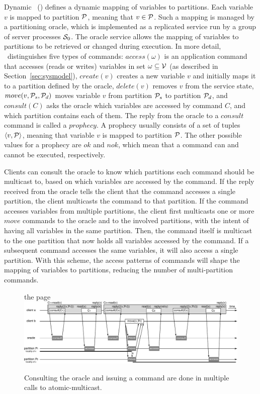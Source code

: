 Dynamic \ssmr\ (\dssmr) defines a dynamic mapping of variables to partitions.
Each variable $v$ is mapped to partition $\mathcal{P}$, meaning that $v \in \mathcal{P}$. Such
a mapping is managed by a partitioning oracle, which is implemented as a
replicated service run by a group of server processes $\mathcal{S}_0$. The oracle
service allows the mapping of variables to partitions to be retrieved or changed
during execution. In more detail, \dssmr\ distinguishes five types of commands:
$access(\omega)$ is an application command that accesses (reads or writes)
variables in set $\omega \subseteq \mathcal{V}$ (as described in
Section~\ref{sec:sysmodel}), $create(v)$ creates a new variable $v$ and
initially maps it to a partition defined by the oracle, $delete(v)$ removes $v$
from the service state,
$move(v,\mathcal{P}_s,\mathcal{P}_d)$ moves variable $v$ from partition $\mathcal{P}_s$ to partition
$\mathcal{P}_d$, and $consult(C)$ asks the oracle which variables are accessed by
command $C$, and which partition contains each of them. The reply from the
oracle to a $consult$ command is called a $prophecy$. A prophecy usually
consists of a set of tuples $\langle v, \mathcal{P} \rangle$, meaning that variable $v$
is mapped to partition $\mathcal{P}$. The other possible values for a prophecy are $ok$
and $nok$, which mean that a command can and cannot be executed, respectively.

Clients can consult the oracle to know which partitions each command should be
multicast to, based on which variables are accessed by the command. If the reply
received from the oracle tells the client that the command accesses a single
partition, the client multicasts the command to that partition. If the command
accesses variables from multiple partitions, the client first multicasts one or
more $move$ commands to the oracle and to the involved partitions, with the
intent of having all variables in the same partition. Then, the command itself
is multicast to the one partition that now holds all variables accessed by the
command. If a subsequent command accesses the same variables, it will also
access a single partition. With this scheme, the access patterns of commands
will shape the mapping of variables to partitions, reducing the number of
multi-partition commands.

\begin{figure}
\begin{minipage}[b]{1.0\linewidth} %
the page
\centering
      \includegraphics[width=0.8\linewidth]{figures/move_case_1}
\end{minipage}
\caption{Consulting the oracle and issuing a command are done in multiple calls to atomic-multicast.}
\label{fig:move_case_1}
\end{figure}

